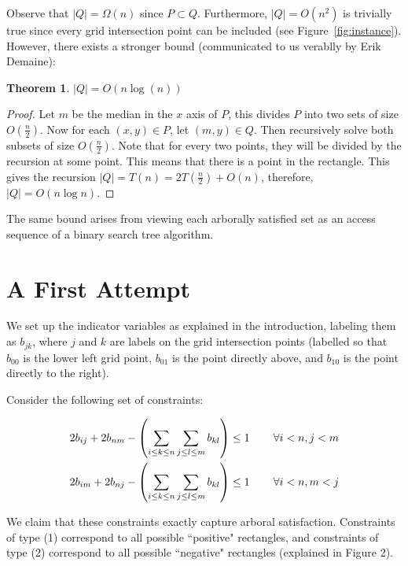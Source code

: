 \documentclass[11pt]{article}
\newtheorem{theorem}{Theorem}
\begin{document}
Observe that $|Q| = \Omega(n)$ since $P \subset Q$. Furthermore, $|Q| = O(n^2)$ is trivially true since every grid intersection point can be included (see Figure~\ref{fig:instance}). However, there exists a stronger bound (communicated to us verablly by Erik Demaine):

\begin{theorem} $|Q| = O(n\log(n))$
\end{theorem}
\begin{proof}
Let $m$ be the median in the $x$ axis of $P$, this divides $P$ into two sets of size $O(\frac{n}{2})$. Now for each $(x,y) \in P$, let $(m, y) \in Q$. Then recursively solve both subsets of size $O(\frac{n}{2})$. Note that for every two points, they will be divided by the recursion at some point. This means that there is a point in the rectangle. This gives the recursion $|Q| = T(n) = 2T(\frac{n}{2}) + O(n)$, therefore, $|Q| = O(n \log n)$. 
\end{proof}

The same bound arises from viewing each arborally satisfied set as an access sequence of a binary search tree algorithm. \cite{geometryBST}

\section{A First Attempt}

We set up the indicator variables as explained in the introduction, labeling them as $b_{jk}$, where $j$ and $k$ are labels on the grid intersection points (labelled so that $b_{00}$ is the lower left grid point, $b_{01}$ is the point directly above, and $b_{10}$ is the point directly to the right).

Consider the following set of constraints:

\begin{align}
2b_{ij} + 2b_{nm} - \left(\sum_{i \leq k \leq n}\sum_{j\leq l \leq m} b_{kl}\right) &\leq 1  \hspace{.3in} \forall i<n, j<m \\
2b_{im} + 2b_{nj} - \left(\sum_{i \leq k \leq n}\sum_{j\leq l \leq m} b_{kl}\right)  &\leq 1  \hspace{.3in} \forall i<n, m<j
\end{align}

We claim that these constraints exactly capture arboral satisfaction. Constraints of type (1) correspond to all possible ``positive" rectangles, and constraints of type (2) correspond to all possible ``negative" rectangles (explained in Figure 2).
\end{document}
